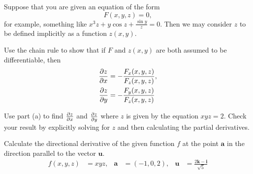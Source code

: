 \documentclass[boxes]{gsypset}
\begin{document}
	\begin{problem}[2.5.36]
		Suppose that you are given an equation of the form
		\[
			F(x,y,z) = 0,
		\]
		for example, something like $x^3z + y\cos z + \frac{\sin y}{z} = 0$. 
		Then we may consider $z$ to be defined implicitly as a function $z(x, y)$.
		\begin{subproblems}
			\subproblem Use the chain rule to show that if 
				$F$ and $z(x,y)$ are both assumed to be differentiable, then
				\begin{align*}
					\frac{\partial^{\kern -.5pt} z}{\partial x^{\kern -.5pt}} &= -\frac{F_x(x,y,z)}{F_z(x,y,z)}, \\
					\frac{\partial^{\kern -.5pt} z}{\partial y^{\kern -.5pt}} &= -\frac{F_y(x,y,z)}{F_z(x,y,z)}
				\end{align*}
				\begin{solution}
					
				\end{solution}
				
			\subproblem Use part (a) to find $\frac{\partial^{\kern -.5pt} z}{\partial x^{\kern -.5pt}}$ and $\frac{\partial^{\kern -.5pt} z}{\partial y^{\kern -.5pt}}$
				where $z$ is given by the equation $xyz = 2$. 
				Check your result by explicitly solving for $z$
				and then calculating the partial derivatives.
				\begin{solution}
					
				\end{solution}
		\end{subproblems}
	\end{problem}
	
	\begin{problem}[2.6.6]
		Calculate the directional derivative of the given function $f$
		at the point $\mathbf{a}$ in the direction parallel to the vector $\mathbf{u}$.
		\begin{align*}
			f(x,y,z) &= xyz, &
			\mathbf{a} &= (-1,0,2), &
			\mathbf{u} &= \frac{2\mathbf{k} - \mathbf{i}}{\sqrt{5}}
		\end{align*}
	\end{problem}
	\begin{solution}
		
	\end{solution}
	
\end{document}

